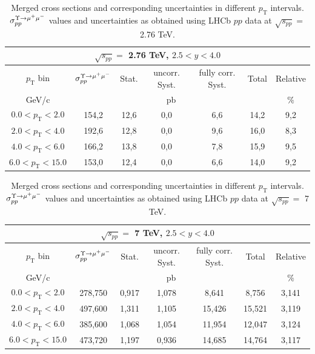 \begin{table}[htp]
\begin{center}
\begin{tabular}{|c||c|c|c|c|c|c|}
  \hline
  \multicolumn{7}{|c|}{$\sqrt{s_{pp}}=$ 2.76 TeV, $2.5<y<4.0$}\\
  \hline
  $p_\mathrm{T}$ bin & $\sigma_{pp}^{\Upsilon\rightarrow \mu^{+}\mu^{\--}} $ & Stat. & uncorr. Syst. & fully corr. Syst. & Total & Relative \\
  \hline
  GeV/c & \multicolumn{5}{c|}{pb} & $\%$ \\
  \hline
  $0.0 < p_\mathrm{T} < 2.0 $ & 154,2 & 12,6 & 0,0 & 6,6 & 14,2 & 9,2 \\
  \hline
  $2.0 < p_\mathrm{T} < 4.0 $& 192,6 & 12,8 & 0,0	 & 9,6 & 16,0 & 8,3\\
  \hline
  $4.0 < p_\mathrm{T} < 6.0 $& 166,2 & 13,8 & 0,0	 & 7,8 & 15,9 & 9,5\\
  \hline
  $6.0 < p_\mathrm{T} < 15.0 $& 153,0 & 12,4	 & 0,0 & 6,6 & 14,0 & 9,2\\
  \hline
\end{tabular}
\caption{Merged cross sections and corresponding uncertainties in different $p_\mathrm{T}$ intervals. $\sigma_{pp}^{\Upsilon\rightarrow \mu^{+}\mu^{\--}} $ values and uncertainties as obtained using LHCb $pp$ data at $\sqrt{s_{pp}}=$ 2.76 TeV.}\label{table:LHCbData276}
\end{center}
\end{table}

\begin{table}[htp]
\begin{center}
\begin{tabular}{|c||c|c|c|c|c|c|}
  \hline
  \multicolumn{7}{|c|}{$\sqrt{s_{pp}}=$ 7 TeV, $2.5<y<4.0$}\\
  \hline
  $p_\mathrm{T}$ bin & $\sigma_{pp}^{\Upsilon\rightarrow \mu^{+}\mu^{\--}} $ & Stat. & uncorr. Syst. & fully corr. Syst. & Total & Relative \\
  \hline
  GeV/c & \multicolumn{5}{c|}{pb} & $\%$ \\
  \hline
  $0.0 < p_\mathrm{T} < 2.0 $ & 278,750 & 0,917 & 1,078 & 8,641 & 8,756 & 3,141 \\
  \hline
  $2.0 < p_\mathrm{T} < 4.0 $& 497,600 & 1,311 & 1,105 & 15,426 & 15,521 & 3,119 \\
  \hline
  $4.0 < p_\mathrm{T} < 6.0 $& 385,600 & 1,068 & 1,054 & 11,954 & 12,047 & 3,124 \\
  \hline
  $6.0 < p_\mathrm{T} < 15.0 $& 473,720 & 1,197 & 0,936 & 14,685 & 14,764 & 3,117 \\
  \hline
\end{tabular}
\caption{Merged cross sections and corresponding uncertainties in different $p_\mathrm{T}$ intervals. $\sigma_{pp}^{\Upsilon\rightarrow \mu^{+}\mu^{\--}} $ values and uncertainties as obtained using LHCb $pp$ data at $\sqrt{s_{pp}}=$ 7 TeV.}\label{table:LHCbData7}
\end{center}
\end{table}

